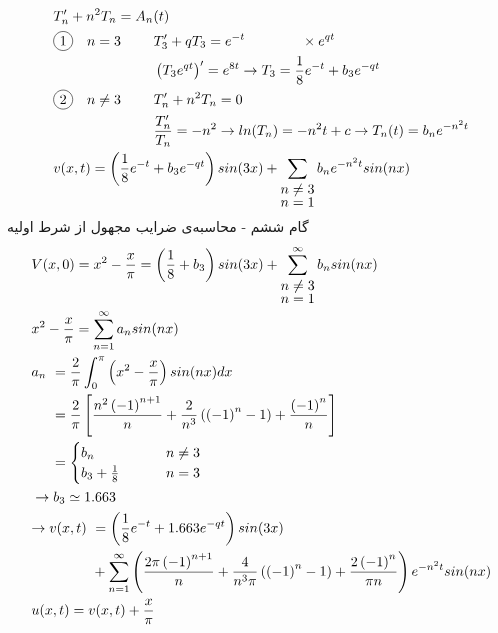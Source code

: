 \begin{equation*}
	\begin{aligned}
		{} &\
		T_n^\prime +n^2T_n=A_n(t)
		\\ &\
		\begin{aligned}
			\circled 1 \quad n=3 \qquad {} &\
			T_3^\prime+qT_3=e^{-t}\qquad \qquad \times e^{qt}
			\\ &\
			\pr{T_3e^{qt}}^\prime=e^{8t}\rightarrow T_3=\frac18e^{-t}+b_3e^{-qt}
		\end{aligned}
		\\ &\
		\begin{aligned}
			\circled2 \quad n\ne3\qquad {}&\
			T_n^\prime+n^2T_n=0
			\\ &\
			\frac{T_n^\prime}{T_n}=-n^2\rightarrow ln(T_n)=-n^2t+c\rightarrow T_n(t)=b_ne^{-n^2t}
		\end{aligned}
		\\ &\
		v(x,t)=\pr{\frac18e^{-t}+b_3e^{-qt}}sin(3x)+\sum_{\myover{n=1}{n\ne3}} b_n e^{-n^2t}sin(nx)
	\end{aligned}
\end{equation*}
گام ششم - محاسبه‌ی ضرایب مجهول از شرط اولیه
\begin{equation*}
	\begin{aligned}
		{}&\
		V(x,0)=x^2-\frac x\pi=\pr{\frac18+b_3}sin(3x)+\sum_{\myover{n=1}{n\ne3}}^\infty b_n sin(nx)
		\\&\
		x^2-\frac x\pi=\sum_{n=1}^\infty a_nsin(nx)
		\\ &\
		\begin{aligned}
			a_n {}&\ =
			\frac2\pi\int_0^\pi \pr{x^2-\frac x\pi}sin(nx)dx
			\\ &\
			=\frac 2\pi \left[
			\frac{n^2\pr{-1}^{n+1}}{n}+\frac2{n^3}\pr{\pr{-1}^n-1}+\frac{\pr{-1}^n}{n}
			\right]
			\\ &\
			=
			\begin{cases}
				b_n \qquad &\ n\ne3
				\\
				b_3+\frac18\qquad &\ n=3
			\end{cases}
		\end{aligned}
		\\ &\
		 \rightarrow b_3\simeq 1.663
		\\ &\ 
		\begin{aligned}
			\rightarrow v(x,t){}&\
			=\pr{\frac18e^{-t}+1.663e^{-qt}}sin(3x)
			\\&\
			+\sum_{n=1}^\infty\pr{
			\frac{2\pi\pr{-1}^{n+1}}{n}+\frac4{n^3\pi}\pr{\pr{-1}^n-1}+\frac{2\pr{-1}^n}{\pi n}
			}e^{-n^2t}sin(nx)
		\end{aligned}
	\\ &\
	u(x,t)=v(x,t)+\frac x\pi
	\end{aligned}
\end{equation*}
